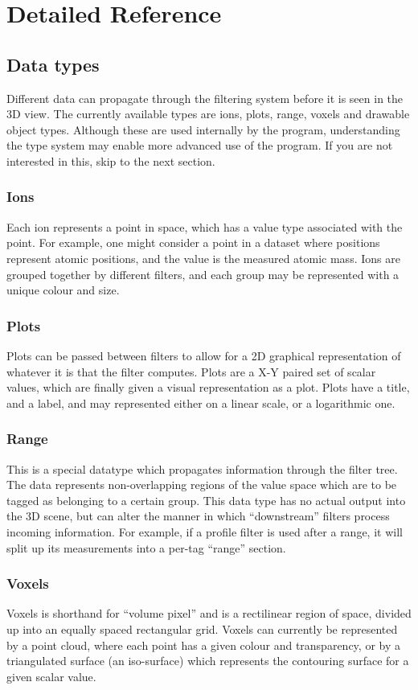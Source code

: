\documentclass[10pt]{article}
\begin{document}
\section{Detailed Reference}
\subsection{Data types}
Different data can propagate through the filtering system before it is seen in the 3D view. The currently available types are ions, plots, range, voxels and drawable object types. Although these are used internally by the program, understanding the type system may enable more advanced use of the program. If you are not interested in this, skip to the next section.  

\subsubsection{Ions}
Each ion represents a point in space, which has a value type associated with the point. For example, one might consider a point in a dataset where positions represent atomic positions, and the value is the measured atomic mass. Ions are grouped together by different filters, and each group may be represented with a unique colour and size.  

\subsubsection{Plots}
Plots can be passed between filters to allow for a 2D graphical representation of whatever it is that the filter computes. Plots are a X-Y paired set of scalar values, which are finally given a visual representation as a plot. Plots have a title, and a label, and may represented either on a linear scale, or a logarithmic one.

\subsubsection{Range}
This is a special datatype which propagates information through the filter tree. The data represents non-overlapping regions of the value space which are to be tagged as belonging to a certain group. This data type has no actual output into the 3D scene, but can alter the manner in which ``downstream'' filters process incoming information. For example, if a profile filter is used after a range, it will split up its measurements into a per-tag ``range'' section. 

\subsubsection{Voxels}
Voxels is shorthand for ``volume pixel'' and is a rectilinear region of space, divided up into an equally spaced rectangular grid. Voxels can currently be represented by a point cloud, where each point has a given colour and transparency, or by a triangulated surface (an iso-surface) which represents the contouring surface for a given scalar value.
\end{document}
